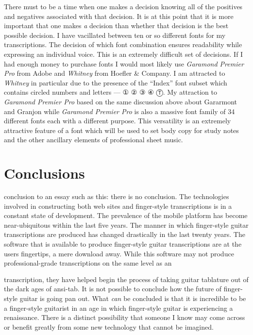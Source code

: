 \documentclass[nofonts,nobib]{tufte-handout}
\newcommand{\textls}[2][5]{%
    \begingroup\addfontfeatures{LetterSpace=#1}#2\endgroup
  }
\renewcommand{\smallcapsspacing}[1]{\textls[10]{#1}}
\renewcommand{\textsc}[1]{\smallcapsspacing{\textsmallcaps{#1}}}
\begin{document}
There must to be a time when one makes a decision knowing all of the positives
and negatives associated with that decision. It is at this point that it is
more important that one makes \emph{a} decision than whether that decision is
the best possible decision. I have vacillated between ten or so different
fonts for my transcriptions. The decision of which font combination ensures
readability while expressing an individual voice. This is an extremely
difficult set of decisions. If I had enough money to purchase fonts I would
most likely use \emph{Garamond Premier Pro} from Adobe and \emph{Whitney} from
Hoefler \& Company.\autocites{garamondPremier,hoeflerWhitney} I am attracted
to \emph{Whitney} in particular due to the presence of the ``Index'' font
subset which contains circled numbers and letters --- {\symbolfont① ② ③ ④
  Ⓣ}. My attraction to \emph{Garamond Premier Pro} based on the same
discussion above about Gararmont and Granjon while \emph{Garamond Premier Pro}
is also a massive font family of 34 different fonts each with a different
purpose. This versatility is an extremely attractive feature of a font which
will be used to set body copy for study notes and the other ancillary elements
of professional sheet music.

\section{Conclusions}
\label{sec:conclusions}

 conclusion to an essay such as this: there
is no conclusion. The technologies involved in constructing both web sites and
finger-style transcriptions is in a constant state of development. The
prevalence of the mobile platform has become near-ubiquitous within the last
five years. The manner in which finger-style guitar transcriptions are
produced has changed drastically in the last twenty years. The software that
is available to produce finger-style guitar transcriptions are at the users
fingertips, a mere download away. While this software may not produce
professional-grade transcriptions on the same level as an \textsc{sel}
transcription, they have helped begin the process of taking guitar tablature
out of the dark ages of ansi-tab. It is not possible to conclude how the
future of finger-style guitar is going pan out. What \emph{can} be concluded
is that it is incredible to be a finger-style guitarist in an age in which
finger-style guitar is experiencing a renaissance. There is a distinct
possibility that someone I know may come across or benefit greatly from some
new technology that cannot be imagined.

\nocite{alexAnderson,alexDeGrassi,andrewWhite,andyMcKee,billyMcLaughlin,adamRafferty,calumGraham,cliveCarroll,craigDAndrea,evaAtmatzidou,ewanDobson,garethPearson,happyTraum,ianEthanCase,janetFeder,jimmyWahlsteen,jonGomm,kakiKing,kellyValleau,kevinHorrigan,leoKottke,lucaStricagnoli,lucasMich,masaakiKishibe,michaelChap,michaelGul,mikeDawes,murielAnders,peppino,peterCiluzzi,peterFinger,pierre,rayMontford,pino,spencerElliot,sunghaJung,thomasLeeb,timSparks,tommyEmmanuel,trevorGH,vickiGenfan}
% 
% 
\printbibliography
\end{document}
